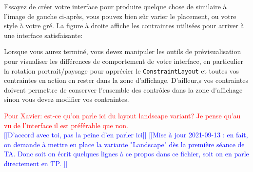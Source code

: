 \documentclass[a4paper,10pt]{article}
\begin{document}
Essayez de créer votre interface pour produire quelque chose de similaire à l'image de gauche ci-après, vous pouvez bien sûr varier le placement, ou votre style à votre gré. La figure à droite affiche les contraintes utilisées pour arriver à une interface satisfaisante:

\begin{center}
	\hfill
	\hfill
	\hfill
\end{center}

Lorsque vous aurez terminé, vous devez manipuler les outils de prévisualisation pour visualiser les différences de comportement de votre interface, en particulier la rotation portrait/paysage pour apprécier le \texttt{ConstraintLayout} et toutes vos contraintes en action en rester dans la zone d'affichage. D'ailleur,s vos contraintes doivent permettre de conserver l'ensemble des contrôles dans la zone d'affichage sinon vous devez modifier vos contraintes. 

\textcolor{red}{Pour Xavier: est-ce qu'on parle ici du layout landscape variant? Je pense qu'au vu de l'interface il est préférable que non.}\\
\textcolor{blue}{[[D'accord avec toi, pas la peine d'en parler ici]]}
\textcolor{blue}{[[Mise à jour 2021-09-13 : en fait, on demande à mettre en place la variante "Landscape" dès la première séance de TA. Donc soit on écrit quelques lignes à ce propos dans ce fichier, soit on en parle directement en TP. ]]}
\end{document}
